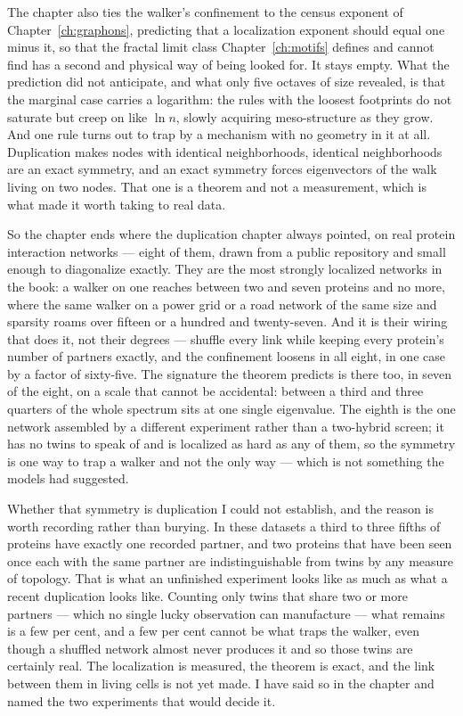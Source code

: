 \documentclass[10pt]{book}
\begin{document}
The chapter also ties the walker's confinement to the census exponent of
Chapter~\ref{ch:graphons}, predicting that a localization exponent should equal one
minus it, so that the fractal limit class Chapter~\ref{ch:motifs} defines and cannot
find has a second and physical way of being looked for. It stays empty. What the
prediction did not anticipate, and what only five octaves of size revealed, is that the
marginal case carries a logarithm: the rules with the loosest footprints do not
saturate but creep on like $\ln n$, slowly acquiring meso-structure as they grow. And
one rule turns out to trap by a mechanism with no geometry in it at all. Duplication
makes nodes with identical neighborhoods, identical neighborhoods are an exact
symmetry, and an exact symmetry forces eigenvectors of the walk living on two nodes.
That one is a theorem and not a measurement, which is what made it worth taking to real
data.

So the chapter ends where the duplication chapter always pointed, on real protein
interaction networks --- eight of them, drawn from a public repository and small enough
to diagonalize exactly. They are the most strongly localized networks in the book: a
walker on one reaches between two and seven proteins and no more, where the same walker
on a power grid or a road network of the same size and sparsity roams over fifteen or a
hundred and twenty-seven. And it is their wiring that does it, not their degrees ---
shuffle every link while keeping every protein's number of partners exactly, and the
confinement loosens in all eight, in one case by a factor of sixty-five. The
signature the theorem predicts is there too, in seven of the eight, on a scale that
cannot be accidental: between a third and three quarters of the whole spectrum sits at
one single eigenvalue. The eighth is the one network assembled by a different experiment
rather than a two-hybrid screen; it has no twins to speak of and is localized as hard as
any of them, so the symmetry is one way to trap a walker and not the only way --- which
is not something the models had suggested.

Whether that symmetry is duplication I could not establish, and the reason is worth
recording rather than burying. In these datasets a third to three fifths of proteins
have exactly one recorded partner, and two proteins that have been seen once each with
the same partner are indistinguishable from twins by any measure of topology. That is
what an unfinished experiment looks like as much as what a recent duplication looks
like. Counting only twins that share two or more partners --- which no single lucky
observation can manufacture --- what remains is a few per cent, and a few per cent
cannot be what traps the walker, even though a shuffled network almost never produces
it and so those twins are certainly real. The localization is measured, the theorem is
exact, and the link between them in living cells is not yet made. I have said so in
the chapter and named the two experiments that would decide it.
\end{document}
